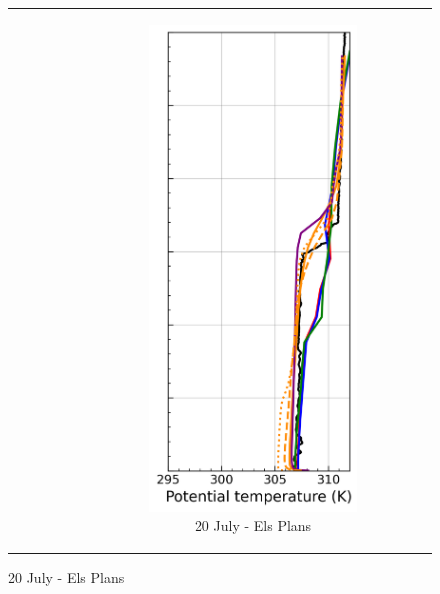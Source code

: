 \begin{figure}[hbtp]
{\begin{tabular}{@{}cccc@{}}
\begin{subfigure}[t]{0.29\textwidth}
        \end{subfigure} &
        \begin{subfigure}[t]{0.285\textwidth}
            \caption{20 July - Els Plans}
            \includegraphics[width=\textwidth]{images/chap6/profiles/profile_elsplans_theta_2007_sensbins.png}

\end{subfigure}
\end{tabular}}
\end{figure}
